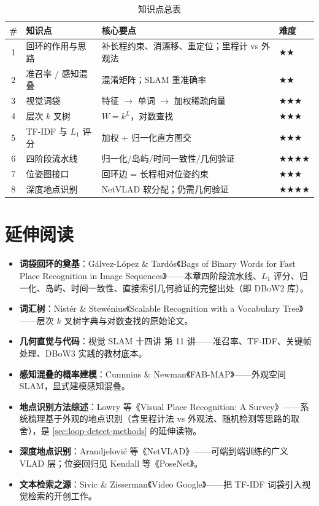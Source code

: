 \begin{table}[H]\centering\small
\caption{知识点总表}
\begin{tabular}{clll}
\toprule
\# & 知识点 & 核心要点 & 难度 \\
\midrule
1 & 回环的作用与思路 & 补长程约束、消漂移、重定位；里程计 vs 外观法 & $\bigstar\bigstar$ \\
2 & 准召率 / 感知混叠 & 混淆矩阵；SLAM 重准确率 & $\bigstar\bigstar$ \\
3 & 视觉词袋 & 特征 $\to$ 单词 $\to$ 加权稀疏向量 & $\bigstar\bigstar\bigstar$ \\
4 & 层次 $k$ 叉树 & $W=k^L$，对数查找 & $\bigstar\bigstar\bigstar$ \\
5 & TF-IDF 与 $L_1$ 评分 & 加权 + 归一化直方图交 & $\bigstar\bigstar\bigstar$ \\
6 & 四阶段流水线 & 归一化/岛屿/时间一致性/几何验证 & $\bigstar\bigstar\bigstar\bigstar$ \\
7 & 位姿图接口 & 回环边 = 长程相对位姿约束 & $\bigstar\bigstar\bigstar$ \\
8 & 深度地点识别 & NetVLAD 软分配；仍需几何验证 & $\bigstar\bigstar\bigstar\bigstar$ \\
\bottomrule
\end{tabular}
\end{table}

\section*{延伸阅读}
\begin{itemize}
  \item \textbf{词袋回环的奠基}：Gálvez-López \& Tardós《Bags of Binary Words for Fast Place Recognition in Image Sequences》\cite{galvez2012bags}——本章四阶段流水线、$L_1$ 评分、归一化、岛屿、时间一致性、直接索引几何验证的完整出处（即 DBoW2 库）。
  \item \textbf{词汇树}：Nistér \& Stewénius《Scalable Recognition with a Vocabulary Tree》\cite{nister2006scalable}——层次 $k$ 叉树字典与对数查找的原始论文。
  \item \textbf{几何直觉与代码}：视觉 SLAM 十四讲\cite{gaoxiang2019slam14} 第 11 讲——准召率、TF-IDF、关键帧处理、DBoW3 实践的教材底本。
  \item \textbf{感知混叠的概率建模}：Cummins \& Newman《FAB-MAP》\cite{cummins2008fabmap}——外观空间 SLAM，显式建模感知混叠。
  \item \textbf{地点识别方法综述}：Lowry 等《Visual Place Recognition: A Survey》\cite{lowry2016vpr}——系统梳理基于外观的地点识别（含里程计法 vs 外观法、随机检测等思路的取舍），是 \cref{sec:loop-detect-methods} 的延伸读物。
  \item \textbf{深度地点识别}：Arandjelović 等《NetVLAD》\cite{arandjelovic2016netvlad}——可端到端训练的广义 VLAD 层；位姿回归见 Kendall 等《PoseNet》\cite{kendall2015posenet}。
  \item \textbf{文本检索之源}：Sivic \& Zisserman《Video Google》\cite{sivic2003video}——把 TF-IDF 词袋引入视觉检索的开创工作。
\end{itemize}


